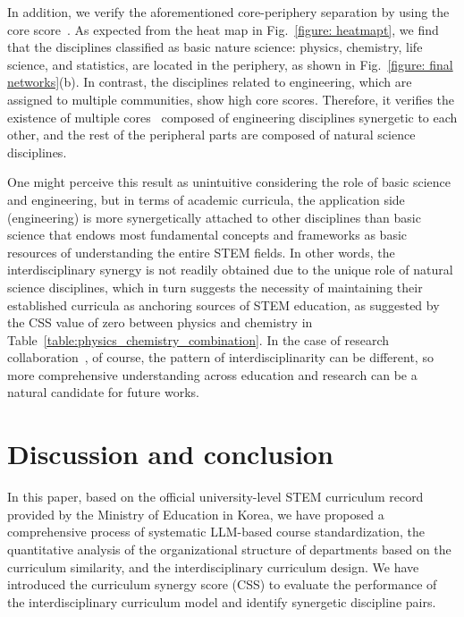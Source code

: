 \documentclass{bmcart}
\begin{document}
In addition, we verify the aforementioned core-periphery separation by using  
the core score~\cite{Rombac2014}. As expected from the heat map in Fig.~\ref{figure: heatmapt}, we find that the disciplines classified as basic nature science: physics, chemistry, life science, and statistics, are located in the periphery, as shown in Fig.~\ref{figure: final networks}(b).  
In contrast, the disciplines related to engineering, which are assigned to multiple communities, show high core scores. Therefore, it verifies the existence of multiple cores~\cite{Kojaku2018} composed of engineering disciplines synergetic to each other, and the rest of the peripheral parts are composed of natural science disciplines. 

One might perceive this result as unintuitive considering the role of basic science and engineering, but in terms of academic curricula, the application side (engineering) is more synergetically attached to other disciplines than basic science that endows most fundamental concepts and frameworks as basic resources of understanding the entire STEM fields. In other words, the interdisciplinary synergy is not readily obtained due to the unique role of natural science disciplines, which in turn suggests the necessity of maintaining their established curricula as anchoring sources of STEM education, as suggested by the CSS value of zero between physics and chemistry in Table~\ref{table:physics_chemistry_combination}. In the case of research collaboration~\cite{HPeng2021}, of course, the pattern of interdisciplinarity can be different, so more comprehensive understanding across education and research can be a natural candidate for future works.

\section{Discussion and conclusion}
\label{sec:conclusion}

In this paper, based on the official university-level STEM curriculum record provided by the Ministry of Education in Korea, we have proposed a comprehensive process of systematic LLM-based course standardization, the quantitative analysis of the organizational structure of departments based on the curriculum similarity, and the interdisciplinary curriculum design. We have introduced the curriculum synergy score (CSS) to evaluate the performance of the interdisciplinary curriculum model and identify synergetic discipline pairs. 
\end{document}
